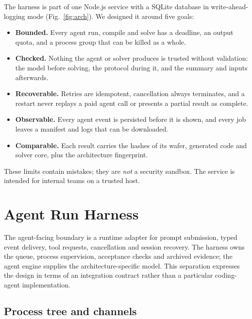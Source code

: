 \documentclass[conference]{IEEEtran}
\begin{document}
The harness is part of one Node.js service with a SQLite database in
write-ahead-logging mode (Fig.~\ref{fig:arch}). We designed it around five
goals:
\begin{itemize}
\item[G1] \textbf{Bounded.} Every agent run, compile and solve has a
deadline, an output quota, and a process group that can be killed as a
whole.
\item[G2] \textbf{Checked.} Nothing the agent or solver produces is trusted
without validation: the model before solving, the protocol during it, and
the summary and inputs afterwards.
\item[G3] \textbf{Recoverable.} Retries are idempotent, cancellation always
terminates, and a restart never replays a paid agent call or presents a
partial result as complete.
\item[G4] \textbf{Observable.} Every agent event is persisted before it is
shown, and every job leaves a manifest and logs that can be downloaded.
\item[G5] \textbf{Comparable.} Each result carries the hashes of its wafer,
generated code and solver core, plus the architecture fingerprint.
\end{itemize}
These limits contain mistakes; they are \emph{not} a security sandbox. The
service is intended for internal teams on a trusted host.

\section{Agent Run Harness}
\label{sec:runs}

The agent-facing boundary is a runtime adapter for prompt submission,
typed event delivery, tool requests, cancellation and session recovery.
The harness owns the queue, process supervision, acceptance checks and
archived evidence; the agent engine supplies the architecture-specific
model. This separation expresses the design in terms of an integration
contract rather than a particular coding-agent implementation.

\subsection{Process tree and channels}
\end{document}
